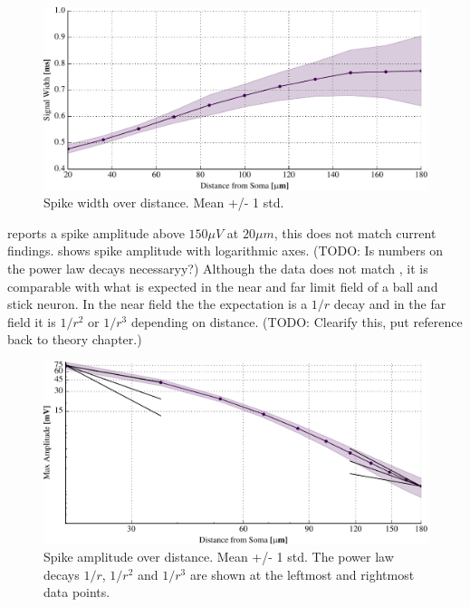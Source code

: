 \documentclass[altfont, fleqn]{uiophd}
\renewcommand{\cref}[1]{{\color{viridis_03}\mycref{#1}} }
\begin{document}
\begin{figure}[thp]
\centering
\includegraphics[width=\textwidth]{images/3_methods/3_1_reproduction/circular_spike_width_std.pdf}
\caption{Spike width over distance. Mean +/- 1 std.}
\label{fig:3_1_spike_width}
\end{figure}

\textcite{pettersen_amplitude_2008} reports a spike amplitude above $150\mu V$ at 
$20\mu m$, this does not match current findings.  
\cref{fig:3_1_spike_amp} shows spike amplitude with logarithmic axes.  
(TODO: Is numbers on the power law decays necessaryy?) Although 
the data does not match \textcite{pettersen_amplitude_2008}, 
it is comparable with what is
expected in the near and far limit field of a ball and stick neuron.
In the near field the the expectation is a $1/r$ decay and in the far field
it is  $1/r^2$ or $1/r^3$ depending on distance. (TODO: Clearify this, put reference
back to theory chapter.)

\begin{figure}[thp]
\centering
\includegraphics[width=\textwidth]{images/3_methods/3_1_reproduction/circular_spike_amp_std_log.pdf}
\caption{Spike amplitude over distance. Mean +/- 1 std. The power law
decays $1/r$, $1/r^2$ and $1/r^3$ are shown at the leftmost and rightmost
data points.}
\label{fig:3_1_spike_amp}
\end{figure}
\end{document}
